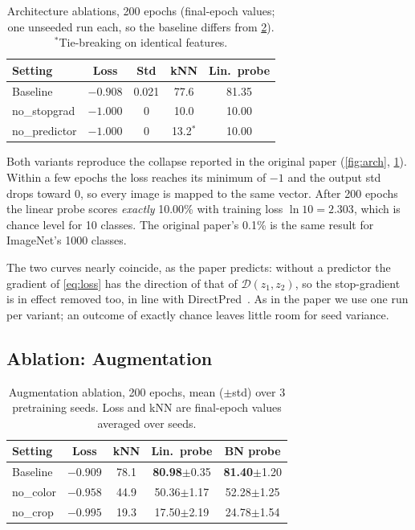 \documentclass[10pt,twocolumn,letterpaper]{article}
\newcommand{\pmstd}[1]{{\scriptsize$\pm$#1}}
\begin{document}
\begin{table}[t]
\centering
\small
\setlength\tabcolsep{4pt}
\begin{tabular}{lcccc}
\toprule
Setting & Loss & Std & kNN & Lin.\ probe \\
\midrule
Baseline & $-0.908$ & 0.021 & 77.6 & 81.35 \\
no\_stopgrad & $-1.000$ & 0 & 10.0 & 10.00 \\
no\_predictor & $-1.000$ & 0 & 13.2$^*$ & 10.00 \\
\bottomrule
\end{tabular}
\caption{Architecture ablations, 200 epochs (final-epoch values; one unseeded run each, so the baseline differs from \cref{tab:aug}). $^*$Tie-breaking on identical features.}
\label{tab:arch}
\end{table}

Both variants reproduce the collapse reported in the original paper (\cref{fig:arch}, \cref{tab:arch}).
Within a few epochs the loss reaches its minimum of $-1$ and the output std drops toward 0, so every image is mapped to the same vector.
After 200 epochs the linear probe scores \emph{exactly} 10.00\% with training loss $\ln 10 = 2.303$, which is chance level for 10 classes. The original paper's 0.1\% is the same result for ImageNet's 1000 classes.

The two curves nearly coincide, as the paper predicts: without a predictor the gradient of \cref{eq:loss} has the direction of that of $\mathcal{D}(z_1,z_2)$, so the stop-gradient is in effect removed too, in line with DirectPred~\cite{tian2021directpred}. As in the paper we use one run per variant; an outcome of exactly chance leaves little room for seed variance.

\subsection{Ablation: Augmentation}
\label{sec:exp_aug}

\begin{table}[t]
\centering
\small
\setlength\tabcolsep{3pt}
\begin{tabular}{lcccc}
\toprule
Setting & Loss & kNN & Lin.\ probe & BN probe \\
\midrule
Baseline & $-0.909$ & 78.1 & \textbf{80.98}\pmstd{0.35} & \textbf{81.40}\pmstd{1.20} \\
no\_color & $-0.958$ & 44.9 & 50.36\pmstd{1.17} & 52.28\pmstd{1.25} \\
no\_crop & $-0.995$ & 19.3 & 17.50\pmstd{2.19} & 24.78\pmstd{1.54} \\
\bottomrule
\end{tabular}
\caption{Augmentation ablation, 200 epochs, mean (\pmstd{std}) over 3 pretraining seeds. Loss and kNN are final-epoch values averaged over seeds.}
\label{tab:aug}
\end{table}
\end{document}
